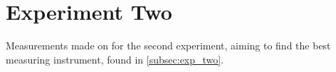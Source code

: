 \section{Experiment Two}\label{app:exp_two}

Measurements made on for the second experiment, aiming to find the best measuring instrument, found in \cref{subsec:exp_two}.






% 
% 

% 
% 
% 

% 
% 

% 
% 

% 
% 

